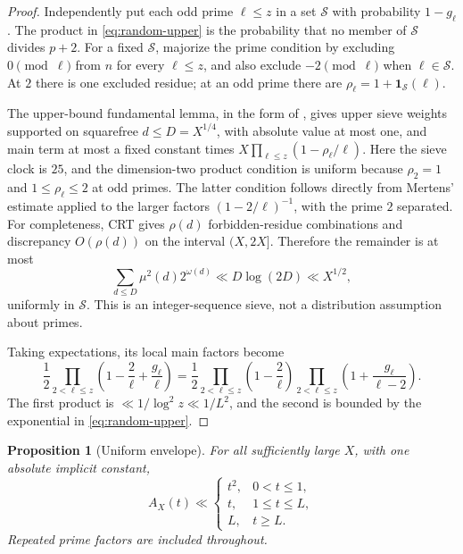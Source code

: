 \documentclass[11pt]{article}
\newtheorem{proposition}[theorem]{Proposition}
\theoremstyle{remark}
\newcommand{\one}{\mathbf 1}
\begin{document}
\begin{proof}
Independently put each odd prime $\ell\le z$ in a set $\mathcal S$ with
probability $1-g_\ell$. The product in \eqref{eq:random-upper} is the
probability that no member of $\mathcal S$ divides $p+2$.
For a fixed $\mathcal S$, majorize the prime condition by excluding
$0\pmod\ell$ from $n$ for every $\ell\le z$, and also exclude
$-2\pmod\ell$ when $\ell\in\mathcal S$. At $2$ there is one excluded
residue; at an odd prime there are
$\rho_\ell=1+\one_{\mathcal S}(\ell)$.

The upper-bound fundamental lemma, in the form of
\cite[Theorem 19.1 and its deduction of Theorem 18.11]{kouk}, gives
upper sieve weights supported on squarefree $d\le D=X^{1/4}$,
with absolute value at most one, and main term at most a fixed
constant times $X\prod_{\ell\le z}(1-\rho_\ell/\ell)$.
Here the sieve clock is $25$, and the dimension-two product condition
is uniform because $\rho_2=1$ and $1\le\rho_\ell\le2$ at odd primes.
The latter condition follows directly from Mertens' estimate applied
to the larger factors $(1-2/\ell)^{-1}$, with the prime $2$ separated.
For completeness, CRT gives $\rho(d)$ forbidden-residue combinations
and discrepancy $O(\rho(d))$ on the interval $(X,2X]$. Therefore the
remainder is at most
\[
 \sum_{d\le D}\mu^2(d)2^{\omega(d)}\ll D\log(2D)\ll X^{1/2},
\]
uniformly in $\mathcal S$. This is an integer-sequence sieve, not a
distribution assumption about primes.

Taking expectations, its local main factors become
\[
 \frac12\prod_{2<\ell\le z}
       \left(1-\frac2\ell+\frac{g_\ell}{\ell}\right)
 =\frac12\prod_{2<\ell\le z}\left(1-\frac2\ell\right)
       \prod_{2<\ell\le z}\left(1+\frac{g_\ell}{\ell-2}\right).
\]
The first product is $\ll1/\log^2z\ll1/L^2$, and the second is bounded
by the exponential in \eqref{eq:random-upper}.
\end{proof}

\begin{proposition}[Uniform envelope]\label{prop:envelope}
For all sufficiently large $X$, with one absolute implicit constant,
\begin{equation}\label{eq:envelope}
 A_X(t)\ll
 \begin{cases}
 t^2,&0<t\le1,\\
 t,&1\le t\le L,\\
 L,&t\ge L.
 \end{cases}
\end{equation}
Repeated prime factors are included throughout.
\end{proposition}
\end{document}
